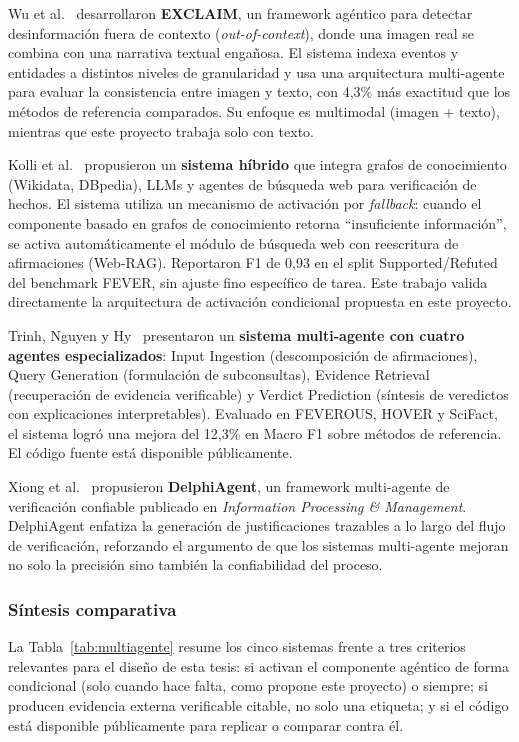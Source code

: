 Wu et al.~\cite{Wu2024} desarrollaron \textbf{EXCLAIM}, un framework agéntico para detectar desinformación fuera de contexto (\textit{out-of-context}), donde una imagen real se combina con una narrativa textual engañosa. El sistema indexa eventos y entidades a distintos niveles de granularidad y usa una arquitectura multi-agente para evaluar la consistencia entre imagen y texto, con 4,3\% más exactitud que los métodos de referencia comparados. Su enfoque es multimodal (imagen + texto), mientras que este proyecto trabaja solo con texto.

Kolli et al.~\cite{Kolli2025} propusieron un \textbf{sistema híbrido} que integra grafos de conocimiento (Wikidata, DBpedia), LLMs y agentes de búsqueda web para verificación de hechos. El sistema utiliza un mecanismo de activación por \textit{fallback}: cuando el componente basado en grafos de conocimiento retorna ``insuficiente información'', se activa automáticamente el módulo de búsqueda web con reescritura de afirmaciones (Web-RAG). Reportaron F1 de 0,93 en el split Supported/Refuted del benchmark FEVER, sin ajuste fino específico de tarea. Este trabajo valida directamente la arquitectura de activación condicional propuesta en este proyecto.

Trinh, Nguyen y Hy~\cite{Trinh2025} presentaron un \textbf{sistema multi-agente con cuatro agentes especializados}: Input Ingestion (descomposición de afirmaciones), Query Generation (formulación de subconsultas), Evidence Retrieval (recuperación de evidencia verificable) y Verdict Prediction (síntesis de veredictos con explicaciones interpretables). Evaluado en FEVEROUS, HOVER y SciFact, el sistema logró una mejora del 12,3\% en Macro F1 sobre métodos de referencia. El código fuente está disponible públicamente.

Xiong et al.~\cite{Xiong2025} propusieron \textbf{DelphiAgent}, un framework multi-agente de verificación confiable publicado en \textit{Information Processing \& Management}. DelphiAgent enfatiza la generación de justificaciones trazables a lo largo del flujo de verificación, reforzando el argumento de que los sistemas multi-agente mejoran no solo la precisión sino también la confiabilidad del proceso.

\subsubsection{Síntesis comparativa}

La Tabla~\ref{tab:multiagente} resume los cinco sistemas frente a tres criterios relevantes para el diseño de esta tesis: si activan el componente agéntico de forma condicional (solo cuando hace falta, como propone este proyecto) o siempre; si producen evidencia externa verificable citable, no solo una etiqueta; y si el código está disponible públicamente para replicar o comparar contra él.

